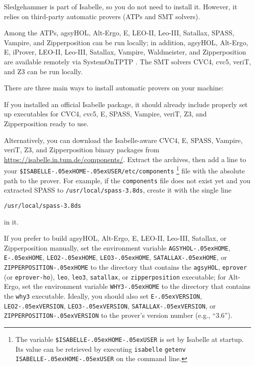 \documentclass[a4paper,12pt]{article}
\newcommand\download{\url{https://isabelle.in.tum.de/components/}}
\renewcommand\_{\hbox{\textunderscore\kern-.05ex}}
\begin{document}
Sledgehammer is part of Isabelle, so you do not need to install it. However, it
relies on third-party automatic provers (ATPs and SMT solvers).

Among the ATPs, agsyHOL, Alt-Ergo, E, LEO-II, Leo-III, Satallax, SPASS, Vampire,
and Zipperposition can be run locally; in addition, agsyHOL, Alt-Ergo, E,
iProver, LEO-II, Leo-III, Satallax, Vampire, Waldmeister, and Zipperposition are
available remotely via System\-On\-TPTP \cite{sutcliffe-2000}. The SMT solvers
CVC4, cvc5, veriT, and Z3 can be run locally.

There are three main ways to install automatic provers on your machine:

\begin{sloppy}
\begin{enum}
\item[\labelitemi] If you installed an official Isabelle package, it should
already include properly set up executables for CVC4, cvc5, E, SPASS, Vampire,
veriT, Z3, and Zipperposition ready to use.

\item[\labelitemi] Alternatively, you can download the Isabelle-aware CVC4, E,
SPASS, Vampire, veriT, Z3, and Zipperposition binary packages from \download.
Extract the archives, then add a line to your
\texttt{\$ISABELLE\_HOME\_USER\slash etc\slash components}%
\footnote{The variable \texttt{\$ISABELLE\_HOME\_USER} is set by Isabelle at
startup. Its value can be retrieved by executing \texttt{isabelle}
\texttt{getenv} \texttt{ISABELLE\_HOME\_USER} on the command line.}
file with the absolute path to the prover. For example, if the
\texttt{components} file does not exist yet and you extracted SPASS to
\texttt{/usr/local/spass-3.8ds}, create it with the single line

\prew
\texttt{/usr/local/spass-3.8ds}
\postw

in it.

\item[\labelitemi] If you prefer to build agsyHOL, Alt-Ergo, E, LEO-II,
Leo-III, Satallax, or Zipperposition manually, set the environment variable
\texttt{AGSYHOL\_HOME}, \texttt{E\_HOME}, \texttt{LEO2\_HOME},
\texttt{LEO3\_HOME}, \texttt{SATALLAX\_HOME}, or \texttt{ZIPPERPOSITION\_HOME}
to the directory that contains the \texttt{agsyHOL},
\texttt{eprover} (or \texttt{eprover-ho}),
\texttt{leo}, \texttt{leo3}, \texttt{satallax}, or \texttt{zipperposition}
executable; for Alt-Ergo, set the environment variable \texttt{WHY3\_HOME} to the
directory that contains the \texttt{why3} executable. Ideally, you
should also set \texttt{E\_VERSION}, \texttt{LEO2\_VERSION},
\texttt{LEO3\_VERSION}, \texttt{SATALLAX\_VERSION}, or
\texttt{ZIPPERPOSITION\_VERSION} to the prover's version number (e.g., ``3.6'').


\end{enum}
\end{sloppy}
\end{document}
